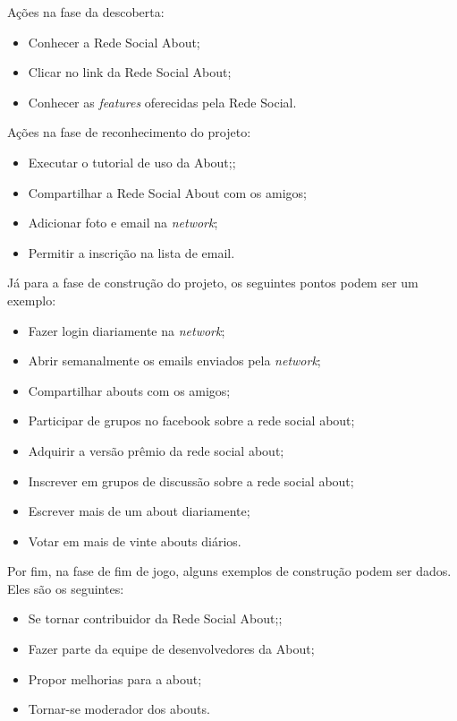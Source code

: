 Ações na fase da descoberta:
\begin{itemize}
    \item Conhecer a Rede Social About;
    \item Clicar no link da Rede Social About;
    \item Conhecer as \textit{features} oferecidas pela Rede Social.
\end{itemize}


Ações na fase de reconhecimento do projeto:
\begin{itemize}
    \item Executar o tutorial de uso da About;;
    \item Compartilhar a Rede Social About com os amigos;
    \item Adicionar foto e email na \textit{network};
    \item Permitir a inscrição na lista de email.
\end{itemize}

Já para a fase de construção do projeto, os seguintes pontos podem ser um
exemplo:

\begin{itemize}
    \item Fazer login diariamente na \textit{network};
    \item Abrir semanalmente os emails enviados pela \textit{network};
    \item Compartilhar abouts com os amigos;
    \item Participar de grupos no facebook sobre a rede social about;
    \item Adquirir a versão prêmio da rede social about;
    \item Inscrever em grupos de discussão sobre a rede social about;
    \item Escrever mais de um about diariamente;
    \item Votar em mais de vinte abouts diários.
\end{itemize}

Por fim, na fase de fim de jogo, alguns exemplos de construção podem ser dados.
Eles são os seguintes:
\begin{itemize}
    \item Se tornar contribuidor da Rede Social About;;
    \item Fazer parte da equipe de desenvolvedores da About;
    \item Propor melhorias para a about;
    \item Tornar-se moderador dos abouts.
\end{itemize}

